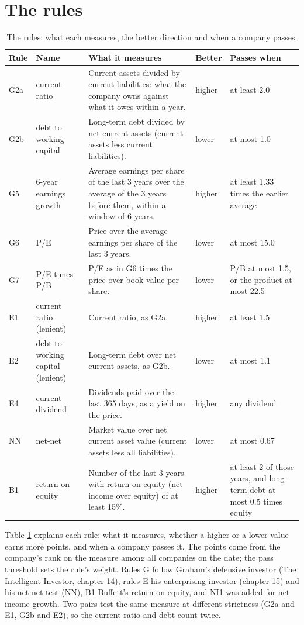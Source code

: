 \documentclass[11pt,a4paper]{article}
\begin{document}
\section{The rules}
\label{app:rules}
\begin{table}[H]
\centering
\small
\caption{The rules: what each measures, the better direction and when a company passes.}\label{tab:rules}
\begin{tabular}{l p{2.2cm} p{5.2cm} l p{2.8cm}}
\hline
Rule & Name & What it measures & Better & Passes when \\
\hline
G2a & current ratio & Current assets divided by current liabilities: what the company owns against what it owes within a year. & higher & at least 2.0 \\
G2b & debt to working capital & Long-term debt divided by net current assets (current assets less current liabilities). & lower & at most 1.0 \\
G5 & 6-year earnings growth & Average earnings per share of the last 3 years over the average of the 3 years before them, within a window of 6 years. & higher & at least 1.33 times the earlier average \\
G6 & P/E & Price over the average earnings per share of the last 3 years. & lower & at most 15.0 \\
G7 & P/E times P/B & P/E as in G6 times the price over book value per share. & lower & P/B at most 1.5, or the product at most 22.5 \\
E1 & current ratio (lenient) & Current ratio, as G2a. & higher & at least 1.5 \\
E2 & debt to working capital (lenient) & Long-term debt over net current assets, as G2b. & lower & at most 1.1 \\
E4 & current dividend & Dividends paid over the last 365 days, as a yield on the price. & higher & any dividend \\
NN & net-net & Market value over net current asset value (current assets less all liabilities). & lower & at most 0.67 \\
B1 & return on equity & Number of the last 3 years with return on equity (net income over equity) of at least 15\%. & higher & at least 2 of those years, and long-term debt at most 0.5 times equity \\
\hline
\end{tabular}
\end{table}
Table \ref{tab:rules} explains each rule: what it measures, whether a higher or a lower value earns more points, and when a company passes it. The points come from the company's rank on the measure among all companies on the date; the pass threshold sets the rule's weight. Rules G follow Graham's defensive investor (The Intelligent Investor, chapter 14), rules E his enterprising investor (chapter 15) and his net-net test (NN), B1 Buffett's return on equity, and NI1 was added for net income growth. Two pairs test the same measure at different strictness (G2a and E1, G2b and E2), so the current ratio and debt count twice.
\end{document}
